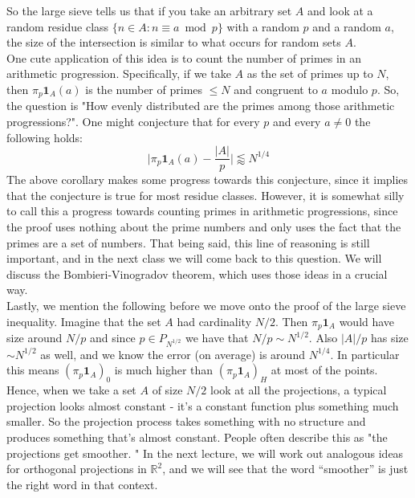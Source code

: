 \documentclass[12pt]{amsart}
\newcommand{\RR}{\mathbb{R}}
\begin{document}
So the large sieve tells us that if you take an arbitrary set $A$ and look at a random residue class $\{ n \in A : n \equiv a \bmod p \}$ with a random $p$ and a random $a$,  the size of the intersection is similar to what occurs for random sets $A$.  \\

One cute application of this idea is to count the number of primes in an arithmetic progression. Specifically, if we take $A$ as the set of primes up to $N$, then $\pi_p \mathbf{1}_A(a)$ is the number of primes $\leq N$ and congruent to $a$ modulo $p$. So, the question is "How evenly distributed are the primes among those arithmetic progressions?". One might conjecture that for every $p$ and every $a \neq 0$ the following holds: 
\begin{equation*}
    \bigg| \pi_p \mathbf{1}_A(a) - \frac{|A|}{p} \bigg| \lessapprox N^{1/4}
\end{equation*}
The above corollary makes some progress towards this conjecture, since it implies that the conjecture is true for most residue classes. However, it is somewhat silly to call this a progress towards counting primes in arithmetic progressions, since the proof uses nothing about the prime numbers and only uses the fact that the primes are a set of numbers. That being said, this line of reasoning is still important, and in the next class we will come back to this question. We will discuss the Bombieri-Vinogradov theorem, which uses those ideas in a crucial way. \\

Lastly, we mention the following before we move onto the proof of the large sieve inequality. Imagine that the set $A$ had cardinality $N/2$. Then $\pi_p \mathbf{1}_A$ would have size around $N/p$ and since $p \in P_{N^{1/2}}$ we have that $N/p \sim N^{1/2}$. Also $|A|/p$ has size $\sim N^{1/2}$ as well, and we know the error (on average) is around $N^{1/4}$. In particular this means $(\pi_p \mathbf{1}_A)_0$ is much higher than $(\pi_p \mathbf{1}_A)_H$ at most of the points. Hence, when we take a set $A$ of size $N/2$ look at all the projections, a typical projection looks almost constant - it's a constant function plus something much smaller. So the projection process takes something with no structure and produces something that's almost constant. People often describe this as "the projections get smoother. "  In the next lecture,  we will work out analogous ideas for orthogonal projections in $\RR^2$,  and we will see that the word ``smoother'' is just the right word in that context.  \\
\end{document}
